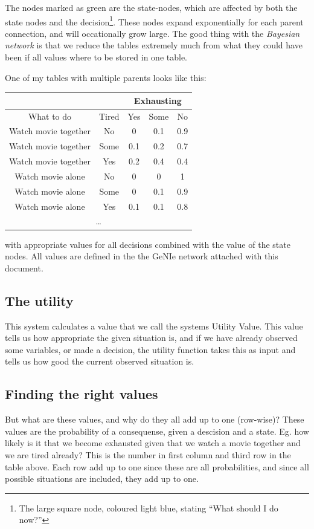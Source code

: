 The nodes marked as green are the state-nodes, which are affected by both
the state nodes and the decision\footnote{The large square node, coloured
light blue, stating ``What should I do now?''}. These nodes expand exponentially for
each parent connection, and will occationally grow large. The good thing with
the \emph{Bayesian network} is that we reduce the tables extremely much from
what they could have been if all values where to be stored in one table.

One of my tables with multiple parents looks like this:

\begin{tabular}{|c|c||c|c|c|}
\hline
\multicolumn{2}{|c|}{} & \multicolumn{3}{|c|}{Exhausting}\\
\hline
What to do & Tired & Yes & Some & No \\
\hline
\hline
Watch movie together & No & 0 & 0.1 & 0.9\\
Watch movie together & Some & 0.1 & 0.2 & 0.7\\
Watch movie together & Yes & 0.2 & 0.4 & 0.4\\
\hline
Watch movie alone & No & 0 & 0 & 1\\
Watch movie alone & Some & 0 & 0.1 & 0.9\\
Watch movie alone & Yes & 0.1 & 0.1 & 0.8\\
\hline
\multicolumn{5}{c}{\ldots}\\
\end{tabular}

with appropriate values for all decisions combined with the value of the state
nodes. All values are defined in the the GeNIe network attached with this
document.

\subsection{The utility}
This system calculates a value that we call the systems Utility Value. This
value tells us how appropriate the given situation is, and if we have already
observed some variables, or made a decision, the utility function takes this as
input and tells us how good the current observed situation is.

\subsection{Finding the right values}
But what are these values, and why do they all add up to one (row-wise)?
These values are the probability of a consequense, given a descision and a
state. Eg. how likely is it that we become exhausted given that we watch a movie
together and we are tired already? This is the number in first column and third
row in the table above. Each row add up to one since these are all
probabilities, and since all possible situations are included, they add up to
one.

